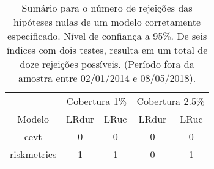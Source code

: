 \begin{table}[H]

\caption{\label{tab:vartest_suma}Sumário para o número de rejeições das hipóteses nulas de um modelo 
corretamente especificado. Nível de confiança a 95\%. De seis índices com 
dois testes, resulta em um total de doze rejeições possíveis. 
(Período fora da amostra entre 02/01/2014 e  08/05/2018).}
\centering
\begin{tabular}[t]{ccccc}
\toprule
\multicolumn{1}{c}{} & \multicolumn{2}{c}{Cobertura 1\%} & \multicolumn{2}{c}{Cobertura 2.5\%} \\
\cmidrule(l{2pt}r{2pt}){2-3} \cmidrule(l{2pt}r{2pt}){4-5}
Modelo & LRdur & LRuc & LRdur & LRuc\\
\midrule
cevt & 0 & 0 & 0 & 0\\
riskmetrics & 1 & 1 & 0 & 1\\
\bottomrule
\end{tabular}
\end{table}
